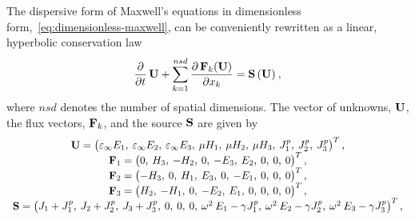 The dispersive form of Maxwell's equations in dimensionless
form,~\eqref{eq:dimensionless-maxwell}, can be conveniently rewritten as a
linear, hyperbolic conservation law\cite{Godlewski:2013tj,LeVeque:2002vc}
\begin{equation}
  \frac{\partial}{\partial t}  \, \mathbf{U} + \sum_{k=1}^{nsd} \frac { \partial \, \mathbf{F}_k(\mathbf{U}) }{ \partial x_k } = \mathbf{S}\,(\mathbf{U}) \: ,
  \label{eq:maxwell-curl-equations-conservation-form}
\end{equation}
where $nsd$ denotes the number of spatial dimensions. The vector of unknowns,
$\mathbf{U}$, the flux vectors, $\mathbf{F}_k$, and the source $\mathbf{S}$ are
given by
\begin{equation*}
  \begin{array}{c}
    \mathbf{U} =
    \begin{pmatrix}
      \varepsilon_{\infty} E_1, \: \varepsilon_{\infty} E_2 , \: \varepsilon_{\infty} E_3 , \: \mu
      H_1 , \: \mu H_2 , \: \mu H_3 , \: J^p_1 , \: J^p_2 , \: J^p_3
    \end{pmatrix}^T,
    \\
    \mathbf{F}_1 =
    \begin{pmatrix}
      0 ,\: H_3 ,\: -H_2 ,\: 0 ,\: -E_3 ,\: E_2 ,\: 0 ,\: 0 ,\: 0
    \end{pmatrix}^T , \\

    \mathbf{F}_2 =
    \begin{pmatrix}
      - H_3 ,\: 0 ,\: H_1 ,\: E_3 ,\: 0 ,\: -E_1 ,\: 0 ,\: 0 ,\: 0
    \end{pmatrix}^T , \\

    \mathbf{F}_3 =
    \begin{pmatrix}
      H_2 ,\: -H_1 ,\: 0 ,\: -E_2 ,\: E_1 ,\: 0 ,\: 0 ,\: 0 ,\: 0
    \end{pmatrix}^T , \\

    \mathbf{S} =
    \begin{pmatrix}
      J_1 + J^p_1 ,\: J_2 + J^p_2 ,\: J_3 + J^p_3 ,\: 0 ,\: 0 ,\: 0 ,\: \omega^2
      \: E_1 - \gamma J^p_1 ,\: \omega^2 \: E_2 - \gamma J^p_2 ,\: \omega^2 \:
      E_3 - \gamma J^p_3
    \end{pmatrix}^T,

  \end{array}
\end{equation*}

